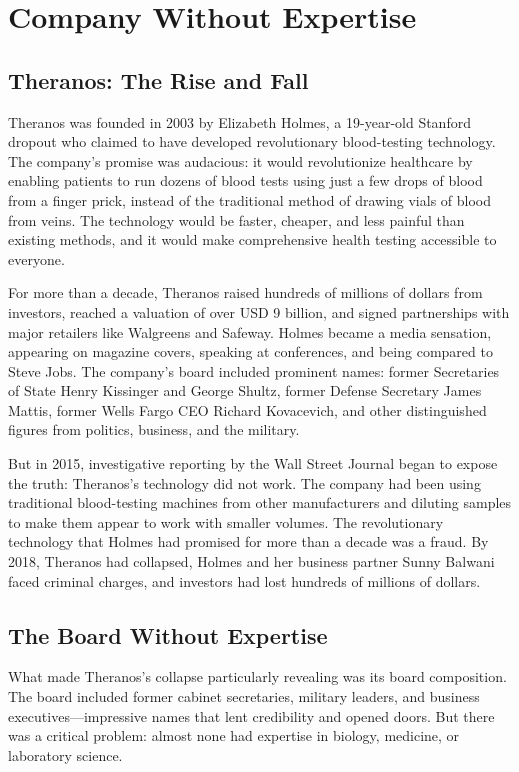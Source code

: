 \chapter{Company Without Expertise}

\section{Theranos: The Rise and Fall}

Theranos was founded in 2003 by Elizabeth Holmes, a 19-year-old Stanford dropout who claimed to have developed revolutionary blood-testing technology. The company's promise was audacious: it would revolutionize healthcare by enabling patients to run dozens of blood tests using just a few drops of blood from a finger prick, instead of the traditional method of drawing vials of blood from veins. The technology would be faster, cheaper, and less painful than existing methods, and it would make comprehensive health testing accessible to everyone.

For more than a decade, Theranos raised hundreds of millions of dollars from investors, reached a valuation of over USD 9 billion, and signed partnerships with major retailers like Walgreens and Safeway. Holmes became a media sensation, appearing on magazine covers, speaking at conferences, and being compared to Steve Jobs. The company's board included prominent names: former Secretaries of State Henry Kissinger and George Shultz, former Defense Secretary James Mattis, former Wells Fargo CEO Richard Kovacevich, and other distinguished figures from politics, business, and the military.

But in 2015, investigative reporting by the Wall Street Journal began to expose the truth: Theranos's technology did not work. The company had been using traditional blood-testing machines from other manufacturers and diluting samples to make them appear to work with smaller volumes. The revolutionary technology that Holmes had promised for more than a decade was a fraud. By 2018, Theranos had collapsed, Holmes and her business partner Sunny Balwani faced criminal charges, and investors had lost hundreds of millions of dollars.

\section{The Board Without Expertise}

What made Theranos's collapse particularly revealing was its board composition. The board included former cabinet secretaries, military leaders, and business executives—impressive names that lent credibility and opened doors. But there was a critical problem: almost none had expertise in biology, medicine, or laboratory science.

